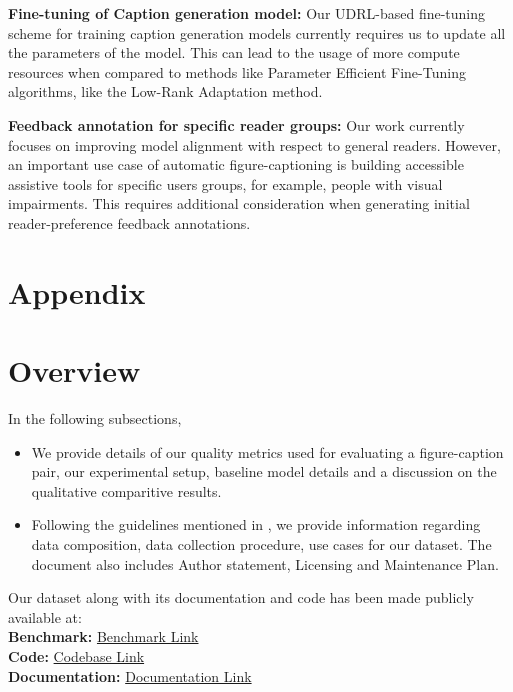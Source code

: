 \documentclass[11pt]{article}
\renewcommand{\cite}[1]{\citep{#1}}
\begin{document}
\textbf{Fine-tuning of Caption generation model:} Our UDRL-based fine-tuning scheme for training caption generation models currently requires us to update all the parameters of the model. This can lead to the usage of more compute resources when compared to methods like Parameter Efficient Fine-Tuning algorithms, like the Low-Rank Adaptation method.

\textbf{Feedback annotation for specific reader groups:} Our work currently focuses on improving model alignment with respect to general readers. However, an important use case of automatic figure-captioning is building accessible assistive tools for specific users groups, for example, people with visual impairments. This requires additional consideration when generating initial reader-preference feedback annotations. 





\appendix

\section*{Appendix}
\label{sec:appendix}

\section{Overview}

In the following subsections, 

\begin{itemize}
    \item 
    We provide details of our quality metrics used for evaluating a figure-caption pair, our experimental setup, baseline model details and a discussion on the qualitative comparitive results.
    \item 
    Following the guidelines mentioned in \cite{gebru2021datasheets}, we provide information regarding data composition, data collection procedure, use cases for our dataset. The document also includes Author statement, Licensing and Maintenance Plan.
\end{itemize}

Our dataset along with its documentation and code has been made publicly available at:
\\
\textbf{Benchmark: }\href{https://figshare.com/s/c034fd77bea9475319cb}{Benchmark Link}\\
\textbf{Code: }\href{https://github.com/FigCapsHF/FigCapsHF}{Codebase Link}\\
\textbf{Documentation: }\href{https://figcapshf.github.io/}{Documentation Link}\\
\end{document}
